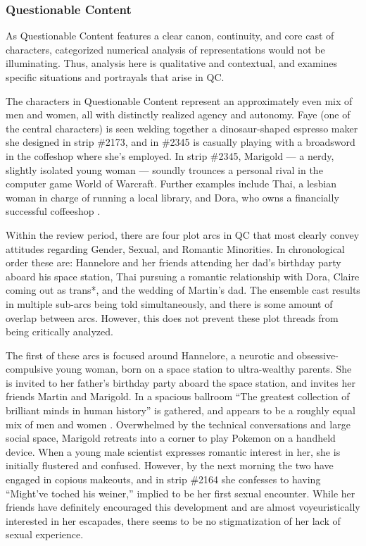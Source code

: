 \documentclass[man,12pt]{apa6}
\begin{document}
\subsubsection{Questionable Content}
As Questionable Content features a clear canon, continuity, and core cast of characters, categorized numerical analysis of representations would not be illuminating. Thus, analysis here is qualitative and contextual, and examines specific situations and portrayals that arise in QC. 

The characters in Questionable Content represent an approximately even mix of men and women, all with distinctly realized agency and autonomy. Faye (one of the central characters) is seen welding together a dinosaur-shaped espresso maker she designed in strip \#2173, and in \#2345 is casually playing with a broadsword in the coffeshop where she's employed. In strip \#2345, Marigold --- a nerdy, slightly isolated young woman --- soundly trounces a personal rival in the computer game World of Warcraft. Further examples include Thai, a lesbian woman in charge of running a local library, and Dora, who owns a financially successful coffeeshop \cite{qc}. 

Within the review period, there are four plot arcs in QC that most clearly convey attitudes regarding Gender, Sexual, and Romantic Minorities. In chronological order these are: Hannelore and her friends attending her dad's birthday party aboard his space station, Thai pursuing a romantic relationship with Dora, Claire coming out as trans*, and the wedding of Martin's dad. The ensemble cast results in multiple sub-arcs being told simultaneously, and there is some amount of overlap between arcs. However, this does not prevent these plot threads from being critically analyzed. 

The first of these arcs is focused around Hannelore, a neurotic and obsessive-compulsive young woman, born on a space station to ultra-wealthy parents. She is invited to her father's birthday party aboard the space station, and invites her friends Martin and Marigold. In a spacious ballroom ``The greatest collection of brilliant minds in human history'' is gathered, and appears to be a roughly equal mix of men and women \cite{qc}. Overwhelmed by the technical conversations and large social space, Marigold retreats into a corner to play Pokemon on a handheld device. When a young male scientist expresses romantic interest in her, she is initially flustered and confused. However, by the next morning the two have engaged in copious makeouts, and in strip \#2164 she confesses to having ``Might've toched his weiner,'' implied to be her first sexual encounter. While her friends have definitely encouraged this development and are almost voyeuristically interested in her escapades, there seems to be no stigmatization of her lack of sexual experience. 
\end{document}
